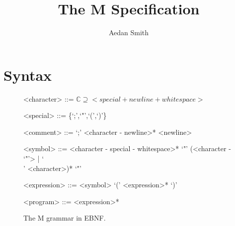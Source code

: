 \documentclass{article}
\title{The M Specification}
\author{Aedan Smith}
\begin{document}
    \maketitle
    \newpage

    \tableofcontents
    \newpage

    \section{Syntax}\label{sec:syntax}

    \begin{figure}[h]
        \setlength{\grammarindent}{8em}
        \centering
        \begin{grammar}
            <character> ::= $\mathbb{C}\supseteq<special + newline + whitespace>$

            <special> ::= \{`;',`"',`(',`)'\}

            <comment> ::= `;' <character - newline>* <newline>

            <symbol> ::= <character - special - whitespace>*
            \alt `"' (<character - `"'> | `\\' <character>)* `"'

            <expression> ::= <symbol>
            \alt `(' <expression>* `)'

            <program> ::= <expression>*
        \end{grammar}
        \caption{The M grammar in EBNF.}
    \end{figure}
\end{document}

